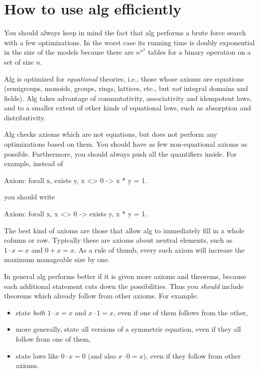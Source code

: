 \documentclass{article}
\begin{document}
\section{How to use alg efficiently}
\label{sec:optimization}

You should always keep in mind the fact that alg performs a brute
force search with a few optimizations. In the worst case its running
time is doubly exponential in the size of the models because there are
$n^{n^2}$ tables for a binary operation on a set of size $n$.

Alg is optimized for \emph{equational} theories, i.e., those whose
axioms are equations (semigroups, monoids, groups, rings, lattices,
etc., but \emph{not} integral domains and fields). Alg takes advantage
of commutativity, associativity and idempotent laws, and to a smaller
extent of other kinds of equational laws, such as absorption and
distributivity.

Alg checks axioms which are not equations, but does not perform any
optimizations based on them. You should have as few non-equational
axioms as possible. Furthermore, you should always push all the
quantifiers inside. For example, instead of
%
\begin{shell}
Axiom: forall x, exists y, x <> 0 -> x * y = 1.
\end{shell}
%
you should write
%
\begin{shell}
Axiom: forall x, x <> 0 -> exists y, x * y = 1.
\end{shell}
%
The best kind of axioms are those that allow alg to immediately fill in
a whole column or row. Typically these are axioms about neutral
elements, such as $1 \cdot x = x$ and $0 + x = x$. As a rule of thumb,
every such axiom will increase the maximum manageable size by one.

In general alg performs better if it is given more axioms and
theorems, because each additional statement cuts down the
possibilities. Thus you \emph{should} include theorems which already
follow from other axioms. For example:
%
\begin{itemize}
\item state \emph{both} $1 \cdot x = x$ and $x \cdot 1 = x$, even if
  one of them follows from the other,
\item more generally, state all versions of a symmetric equation, even
  if they all follow from one of them,
\item state laws like $0 \cdot x = 0$ (and also $x \cdot 0 = x$), even
  if they follow from other axioms.
\end{itemize}
\end{document}
